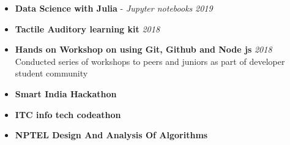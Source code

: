 \documentclass[11pt,a4paper]{article}
\begin{document}
\colorbox{gray}{}
\begin{itemize}
    \item \textbf{Data Science with Julia} - \textit{Jupyter notebooks} \hfill \textit{2019}
    \item \textbf{Tactile Auditory learning kit} \hfill \textit{2018}
\end{itemize}

\colorbox{gray}{}
\begin{itemize}
    \item \textbf{Hands on Workshop on using  Git, Github and Node js} \hfill \textit{2018}
    \\Conducted series of workshops to peers and juniors as part of developer student community
\end{itemize}

\colorbox{gray}{}
\begin{itemize}
    \item \textbf{Smart India Hackathon}
    \item \textbf{ITC info tech codeathon}
    \item \textbf{NPTEL Design And Analysis Of Algorithms}
\end{itemize}
  
\end{document}
